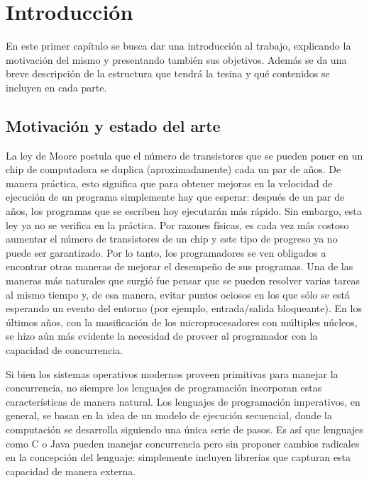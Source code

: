 \chapter{Introducción}

En este primer capítulo se busca dar una introducción al trabajo, explicando la motivación del mismo y presentando también sus objetivos. Además se da una breve descripción de la estructura que tendrá la tesina y qué contenidos se incluyen en cada parte. 

\section{Motivación y estado del arte} 

La ley de Moore postula que el número de transistores que se pueden
poner en un chip de computadora se duplica (aproximadamente) cada un par
de años. De manera práctica, esto significa que para obtener
mejoras en la velocidad de ejecución de un programa simplemente hay
que esperar: después de un par de años, los programas que se escriben
hoy ejecutarán más rápido. Sin embargo, esta ley ya no se verifica en la práctica. Por razones físicas, es cada vez más costoso aumentar el número de transistores de
un chip y este tipo de progreso ya no puede ser garantizado. Por lo tanto, los
programadores se ven obligados a encontrar otras maneras de mejorar el
desempeño de sus programas. Una de las maneras más naturales que
surgió fue pensar que se pueden resolver varias tareas al mismo tiempo
y, de esa manera, evitar puntos ociosos en los que sólo se está esperando un evento del
entorno (por ejemplo, entrada/salida bloqueante). En los últimos años, con la
masificación de los microprocesadores con múltiples núcleos, se hizo aún
más evidente la necesidad de proveer al programador con la capacidad
de concurrencia.

Si bien los sistemas operativos modernos proveen primitivas para
manejar la concurrencia, no siempre los lenguajes de programación incorporan estas características de manera natural. Los lenguajes de
programación imperativos, en general, se basan en la idea de un modelo
de ejecución secuencial, donde la computación se desarrolla siguiendo
una única serie de pasos. Es así que lenguajes como C o Java pueden
manejar concurrencia pero sin proponer cambios radicales en la
concepción del lenguaje: simplemente incluyen librerías que capturan esta
capacidad de manera externa.

